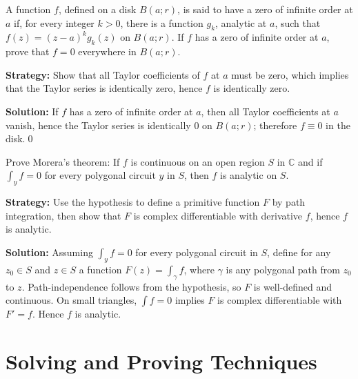 \begin{problembox}
\begin{problemstatement}
A function \( f \), defined on a disk \( B(a; r) \), is said to have a zero of infinite order at \( a \) if, for every integer \( k > 0 \), there is a function \( g_k \), analytic at \( a \), such that \( f(z) = (z - a)^k g_k(z) \) on \( B(a; r) \). If \( f \) has a zero of infinite order at \( a \), prove that \( f = 0 \) everywhere in \( B(a; r) \).
\end{problemstatement}
\end{problembox}

\noindent\textbf{Strategy:} Show that all Taylor coefficients of \( f \) at \( a \) must be zero, which implies that the Taylor series is identically zero, hence \( f \) is identically zero.

\bigskip\noindent\textbf{Solution:}
If $f$ has a zero of infinite order at $a$, then all Taylor coefficients at $a$ vanish, hence the Taylor series is identically $0$ on $B(a;r)$; therefore $f\equiv0$ in the disk.\qed


\begin{problembox}
\begin{problemstatement}
Prove Morera's theorem: If \( f \) is continuous on an open region \( S \) in \( \mathbb{C} \) and if \( \int_y f = 0 \) for every polygonal circuit \( y \) in \( S \), then \( f \) is analytic on \( S \).
\end{problemstatement}
\end{problembox}

\noindent\textbf{Strategy:} Use the hypothesis to define a primitive function \( F \) by path integration, then show that \( F \) is complex differentiable with derivative \( f \), hence \( f \) is analytic.

\bigskip\noindent\textbf{Solution:}
Assuming $\int_y f=0$ for every polygonal circuit in $S$, define for any $z_0\in S$ and $z\in S$ a function $F(z)=\int_{\gamma} f$, where $\gamma$ is any polygonal path from $z_0$ to $z$. Path-independence follows from the hypothesis, so $F$ is well-defined and continuous. On small triangles, $\int f=0$ implies $F$ is complex differentiable with $F'=f$. Hence $f$ is analytic.


\section{Solving and Proving Techniques}

